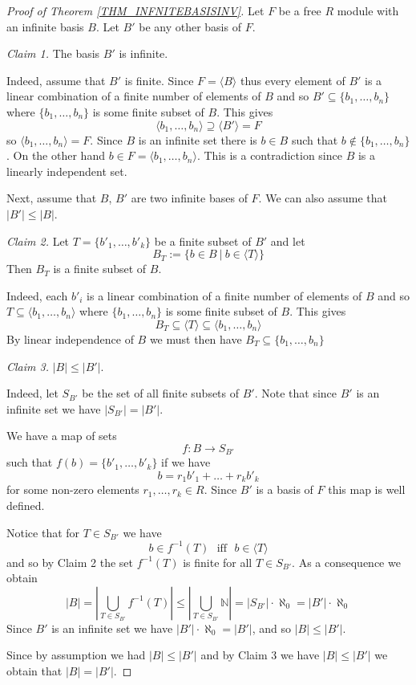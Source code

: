 \documentclass[12pt, letterpaper, oneside]{article}
\theoremstyle{plain}
\theoremstyle{definition}
\newcommand{\N}{{\mathbb N}}
\newcommand{\subgp}[1]{\langle#1\rangle}
\newcommand{\vs}{\vskip 5mm}
\begin{document}
\begin{proof}[Proof of Theorem \ref{THM_INFNITEBASISINV}]
Let $F$ be a free $R$ module with an infinite basis $B$. Let $B'$ be any other basis of 
$F$. 

\vs

\emph{Claim 1.} The basis $B'$ is infinite. 

Indeed, assume that $B'$ is finite. Since $F = \subgp{B}$ thus 
every element of $B'$ is a linear combination of a finite number of elements of $B$ and
so $B' \subseteq \{b_{1}, \dots, b_{n}\}$ where  $\{b_{1}, \dots, b_{n}\}$ is some finite subset of $B$. 
This gives 
$$\subgp{b_{1}, \dots, b_{n}} \supseteq \subgp{B'} = F$$
so $\subgp{b_{1}, \dots, b_{n}} = F$. Since $B$ is an infinite set there is $b\in B$ such that 
$b\not\in \{b_{1}, \dots, b_{n}\}$. On the other hand $b\in F= \subgp{b_{1}, \dots, b_{n}}$. This 
is a contradiction since $B$ is a linearly independent set. 


\vs\vs

Next, assume that  $B$, $B'$ are two infinite bases of $F$. We can also assume that $|B'|\leq |B|$. 

\emph{Claim 2.} Let $T = \{b'_{1}, \dots, b'_{k}\}$ be a finite subset of $B'$ and let 
$$B_{T} := \{b \in B \ | \ b \in \subgp{T} \}$$
Then $B_{T}$ is a finite subset of $B$.

Indeed, each $b'_{i}$  is a linear combination of a finite number of elements of $B$ and
so $T \subseteq \subgp{ b_{1}, \dots, b_{n} }$ where  $\{b_{1}, \dots, b_{n}\}$ is some finite subset of $B$. 
This gives 
$$B_{T} \subseteq \subgp{T} \subseteq \subgp{b_{1}, \dots, b_{n}}$$
By linear independence of $B$ we must then have $B_{T} \subseteq \{b_{1}, \dots, b_{n}\}$


\vs\vs

\emph{Claim 3.} $|B| \leq |B'|$. 


Indeed, let $S_{B'}$ be the set of all finite subsets of $B'$. Note that since $B'$ is an infinite set we have 
$|S_{B'}| = |B'|$.

We have a map of sets 
$$f\colon B  \to S_{B'}$$
such that $f(b) = \{b'_{1}, \dots, b'_{k}\}$ if we have 
$$b = r_{1}b'_{1} + \dots + r_{k}b'_{k}$$
for some non-zero elements $r_{1}, \dots, r_{k} \in R$. Since $B'$ is a basis of $F$ this map is 
well defined. 

Notice that for $T\in S_{B'}$ we have 
$$b\in f^{-1}(T) \ \ \ \text{iff} \ \ \ b\in \subgp{T}$$
and so by Claim 2 the set $f^{-1}(T)$ is finite for all $T\in S_{B'}$. As a consequence we obtain
$$|B| = |\bigcup_{T\in S_{B'}} f^{-1}(T)| \leq |\bigcup_{T\in S_{B'}} \N | = |S_{B'}|\cdot \aleph_{0} = 
|B'|\cdot \aleph_{0}$$
Since $B'$ is an infinite set we have $|B'|\cdot \aleph_{0} = |B'|$, and so $|B| \leq |B'|$.


\vs\vs

Since by assumption we had $|B|\leq |B'|$ and by Claim 3 we have $|B|\leq |B'|$ we obtain that 
$|B|= |B'|$.

\end{proof}
\end{document}
